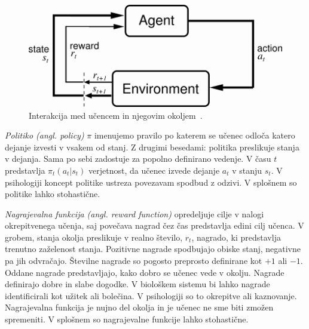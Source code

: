 \documentclass[a4paper, oneside, 12pt]{report}
\begin{document}
\begin{figure}[htbp]
\includegraphics[scale=1.0]{AgentEnvironment.png}
\caption{Interakcija med učencem in njegovim okoljem~\cite{ReinforcementLearningAnIntroduction}.}
\label{figure:AgentEnvironment}
\end{figure}

{\em Politiko (angl. policy)} $\pi$ imenujemo pravilo po katerem se učenec odloča katero dejanje izvesti v vsakem od stanj. Z drugimi besedami: politika preslikuje stanja v dejanja. Sama po sebi zadostuje za popolno definirano vedenje. V času $t$ predstavlja $\pi_t(a_t|s_t)$ verjetnost, da učenec izvede dejanje $a_t$ v stanju $s_t$. V psihologiji koncept politike ustreza povezavam spodbud z odzivi. V splošnem so politike lahko stohastične.

{\em Nagrajevalna funkcija (angl. reward function)} opredeljuje cilje v nalogi okrepitvenega učenja, saj povečava nagrad čez čas predstavlja edini cilj učenca. V grobem, stanja okolja preslikuje v realno število, $r_t$, nagrado, ki predstavlja trenutno zaželenost stanja. Pozitivne nagrade spodbujajo obiske stanj, negativne pa jih odvračajo. Številne nagrade so pogosto preprosto definirane kot $+1$ ali $-1$. Oddane nagrade predstavljajo, kako dobro se učenec vede v okolju. Nagrade definirajo dobre in slabe dogodke. V biološkem sistemu bi lahko nagrade identificirali kot užitek ali bolečina. V psihologiji so to okrepitve ali kaznovanje. Nagrajevalna funkcija je nujno del okolja in je učenec ne sme biti zmožen spremeniti. V splošnem so nagrajevalne funkcije lahko stohastične.
\end{document}
